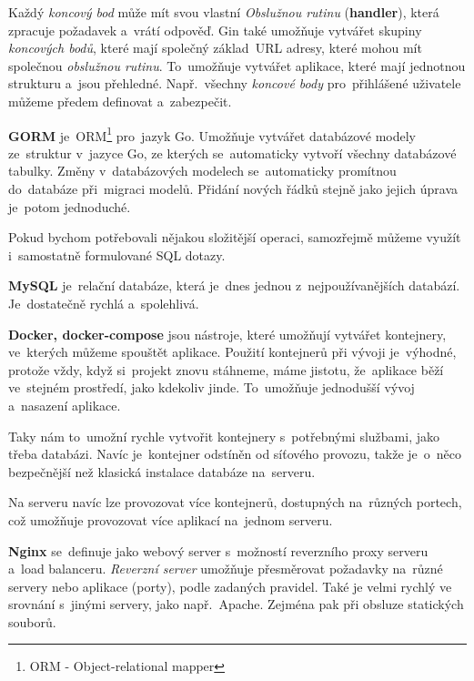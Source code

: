 \documentclass[14pt,a4paper]{article}
\begin{document}
            Každý \emph{koncový bod} může mít svou vlastní \emph{Obslužnou rutinu} (\textbf{handler}), která zpracuje požadavek a~vrátí odpověď.
            Gin také umožňuje vytvářet skupiny \emph{koncových bodů}, které mají společný základ~URL adresy, které mohou mít společnou \emph{obslužnou rutinu}.
            To~umožňuje vytvářet aplikace, které mají jednotnou strukturu a~jsou přehledné. Např.~všechny \emph{koncové body} pro~přihlášené
            uživatele můžeme předem definovat a~zabezpečit. 
            
            \textbf{GORM} je~ORM\footnote{ORM - Object-relational mapper} pro~jazyk Go. Umožňuje vytvářet databázové modely ze~struktur v~jazyce Go, 
            ze kterých se~automaticky vytvoří všechny databázové tabulky. Změny v~databázových modelech se~automaticky promítnou do~databáze při~migraci modelů.
            Přidání nových řádků stejně jako jejich úprava je~potom jednoduché.

            Pokud bychom potřebovali nějakou složitější operaci, samozřejmě můžeme využít i~samostatně formulované SQL dotazy.
            
            \textbf{MySQL} je~relační databáze, která je~dnes jednou z~nejpoužívanějších databází. Je~dostatečně rychlá a~spolehlivá.

            \textbf{Docker, docker-compose} jsou nástroje, které umožňují vytvářet kontejnery, ve~kterých můžeme spouštět aplikace.
            Použití kontejnerů při vývoji je~výhodné, protože vždy, když si~projekt znovu stáhneme, máme jistotu, že~aplikace běží
            ve~stejném prostředí, jako kdekoliv jinde. To~umožňuje jednodušší vývoj a~nasazení aplikace.

            Taky nám to~umožní rychle vytvořit kontejnery s~potřebnými službami, jako třeba databázi. Navíc je~kontejner odstíněn od síťového provozu,
            takže je~o~něco bezpečnější než klasická instalace databáze na~serveru.

            Na serveru navíc lze provozovat více kontejnerů, dostupných na~různých portech, což umožňuje provozovat více aplikací na~jednom serveru.

            \textbf{Nginx} se~definuje jako webový server s~možností reverzního proxy serveru a~load balanceru.
            \emph{Reverzní server} umožňuje přesměrovat požadavky na~různé servery nebo aplikace (porty), podle zadaných pravidel.
            Také je velmi rychlý ve srovnání s~jinými servery, jako např.~Apache. Zejména pak při obsluze statických souborů.
\end{document}
